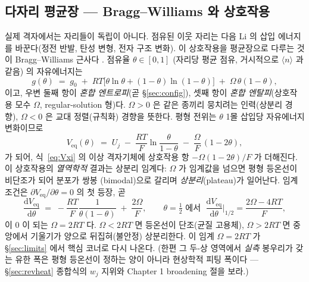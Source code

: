 \documentclass[11pt,a4paper]{article}
\newcommand{\dd}{\mathrm{d}}
\newcommand{\eq}{\mathrm{eq}}
\newcommand{\avg}[1]{\langle #1\rangle}
\begin{document}
\subsection{다자리 평균장 — Bragg--Williams 와 상호작용}\label{ssec:BW}
실제 격자에서는 자리들이 독립이 아니다. 점유된 이웃 자리는 다음 Li 의 삽입 에너지를 바꾼다(정전 반발,
탄성 변형, 전자 구조 변화). 이 상호작용을 평균장으로 다루는 것이 Bragg--Williams 근사다 \cite{huggins2009,
bazant2013}. 점유율 $\theta\in[0,1]$ (자리당 평균 점유, 거시적으로 $\avg{n}$ 과 같음) 의 자유에너지는
\begin{equation}
g(\theta) \;=\; g_0 \;+\; RT\bigl[\theta\ln\theta + (1-\theta)\ln(1-\theta)\bigr]
\;+\; \Omega\,\theta(1-\theta),
\label{eq:BW}
\end{equation}
이고, 우변 둘째 항이 \emph{혼합 엔트로피}(곧 \S\ref{sec:config}), 셋째 항이 \emph{혼합 엔탈피}(상호작용
모수 $\Omega$, regular-solution 형)다. $\Omega>0$ 은 같은 종끼리 뭉치려는 인력(상분리 경향), $\Omega<0$ 은
교대 정렬(규칙화) 경향을 뜻한다. 평형 전위는 $\theta$ 1몰 삽입당 자유에너지 변화이므로
\begin{equation}
V_\eq(\theta) \;=\; U_j \;-\; \frac{RT}{F}\ln\!\frac{\theta}{1-\theta} \;-\; \frac{\Omega}{F}\,(1-2\theta),
\label{eq:Veq_BW}
\end{equation}
가 되어, 식~\eqref{eq:Vxi} 의 이상 격자기체에 상호작용 항 $-\Omega(1-2\theta)/F$ 가 더해진다. 이 상호작용의
\emph{열역학적} 결과는 상분리 임계다: $\Omega$ 가 임계값을 넘으면 평형 등온선이 비단조가 되어 분포가 쌍봉
(bimodal)으로 갈리며 \emph{상분리}(plateau)가 일어난다. 임계 조건은 $\partial V_\eq/\partial\theta=0$ 의 첫 등장, 곧
\begin{equation}
\frac{\dd V_\eq}{\dd\theta} \;=\; -\frac{RT}{F}\frac{1}{\theta(1-\theta)} \;+\; \frac{2\Omega}{F},
\qquad
\theta=\tfrac12\text{ 에서 }\;\frac{\dd V_\eq}{\dd\theta}\Big|_{1/2}=\frac{2\Omega-4RT}{F},
\label{eq:slope_BW}
\end{equation}
이 0 이 되는 $\Omega=2RT$ 다. $\Omega<2RT$ 면 등온선이 단조(균질 고용체), $\Omega>2RT$ 면 중앙에서
기울기가 양으로 뒤집혀(불안정) 상분리한다. 이 임계 $\Omega=2RT$ 가 \S\ref{sec:limits} 에서 핵심 코너로 다시
나온다. (한편 그 두-상 영역에서 \emph{실측} 봉우리가 갖는 유한 폭은 평형 등온선이 정하는 양이 아니라 현상학적
피팅 폭이다 — \S\ref{sec:revheat} 종합식의 $w_j$ 지위와 Chapter 1 broadening 절을 보라.)

\end{document}
